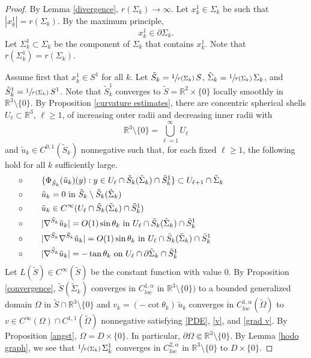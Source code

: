 \documentclass[11pt]{amsart}
\begin{document}
\begin{proof}
	

	
 By Lemma \ref{divergence}, $r(\Sigma_k)\to \infty$. Let  $x^{1}_{k}\in \Sigma_k$ be such that $|x^{1}_{k}|=r(\Sigma_k)$. By the maximum principle, $$x^{1}_k\in \partial \Sigma_k.$$
Let $\Sigma^1_k\subset \Sigma_k$ be the component of $\Sigma_k$ that contains $x^{1}_k$. Note that $r(\Sigma^1_k)=r(\Sigma_k)$.


Assume first that $x^{1}_k\in S^1$ for all $k$. Let $\tilde S_k=\sfrac1{r(\Sigma_k)}\,S$, $\tilde \Sigma_k=\sfrac{1}{r(\Sigma_k)}\,\Sigma_k$, and $\tilde S^1_k=\sfrac1{r(\Sigma_k)}\,S^1$. Note that $\tilde S^1_k$ converges  to $\tilde S=\mathbb{R}^2\times \{0\}$ locally smoothly in $\mathbb{R}^3\setminus \{0\}$. By Proposition \ref{curvature estimates}, there are
 concentric spherical shells $U_\ell\subset \mathbb{R}^3$, $\ell \geq 1$, of increasing outer radii and decreasing inner radii with 
 $$
 \mathbb{R}^3\setminus\{0\}=\bigcup_{\ell=1}^\infty U_\ell
 $$
and 	$\tilde u_k\in C^{0,1}(\tilde S_k)$ nonnegative  such that, for each fixed $\ell \geq 1$,  the following hold for all $k$  sufficiently large.
\begin{align*}
	&\circ\qquad  \text{$\{\Phi_{\tilde S_k}(\tilde u_k)(y):y\in U_{\ell}\cap \tilde S_k(\tilde \Sigma_k)\cap \tilde S^1_k\}\subset U_{\ell+1}\cap \tilde \Sigma_k$}\hspace{3cm}\\ 		
		&\circ\qquad \text{$\tilde u_k=0$ in $\tilde S_k\setminus \tilde S_k(\tilde\Sigma_k)$} \\
			&\circ\qquad \text{$\tilde  u_k\in C^\infty(U_{\ell}\cap  \tilde S_k(\tilde \Sigma_k)\cap \tilde S^1_k)$}\\ 
	&\circ\qquad \text{$|\nabla^{\tilde S_k} \tilde u_k|=O(1) \sin\theta_k$ in $ U_{\ell}\cap \tilde S_k(\tilde \Sigma_k)\cap \tilde S^1_k$}\\ 
	&\circ\qquad \text{$|\nabla^{\tilde S_k}\nabla^{\tilde S_k} \tilde u_k|=O(1)\sin\theta_k$ in $U_{\ell}\cap   \tilde S_k(\tilde \Sigma_k)\cap \tilde S^1_k$}\\ 
	&\circ\qquad \text{$|\nabla^{\tilde S_k}\tilde u_k|=-\tan\theta_k$ on $U_{\ell}\cap \partial \tilde \Sigma_k\cap \tilde S^1_k$}
\end{align*}
Let $L(\tilde S)\in C^\infty(\tilde S)$ be the constant function with value $0$. 
	By Proposition \ref{convergence}, $\tilde S(\tilde \Sigma_k)$ converges in $C_{loc}^{1,\alpha}$ in $\mathbb{R}^3\setminus\{0\})$ to a bounded generalized domain $\Omega$ in $\tilde S\cap \mathbb{R}^3\setminus \{0\}$ and $v_k=(-\cot\theta_k)\,\tilde u_k$ converges  in $C_{loc}^{1,\alpha }(\tilde \Omega)$ to $v\in C^\infty(\Omega)\cap C^{1,1}(\tilde \Omega)$ nonnegative satisfying \eqref{PDE}, \eqref{v}, and \eqref{grad v}. By Proposition \ref{angst},  $\Omega=D\times\{0\}$. In particular, $\partial \Omega \Subset \mathbb{R}^3\setminus\{0\}$. By Lemma \ref{hodo graph}, we see that $\sfrac1{r(\Sigma_k)}\,\Sigma^1_k$ converges in $C^{2,\alpha}_{loc}$ in $\mathbb{R}^3\setminus \{0\}$  to $D\times\{0\}$. 

\end{proof}
\end{document}
